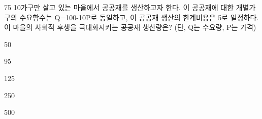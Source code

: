 \begin{question}{75}
10가구만 살고 있는 마을에서 공공재를 생산하고자 한다. 이 공공재에 대한 개별가구의 수요함수는 Q=100-10P로 동일하고, 이 공공재 생산의 한계비용은 5로 일정하다. 이 마을의 사회적 후생을 극대화시키는 공공재 생산량은? (단, Q는 수요량, P는 가격)
\begin{choices}
  \item 50
  \item 95
  \item 125
  \item 250
  \item 500
\end{choices}
\end{question}
